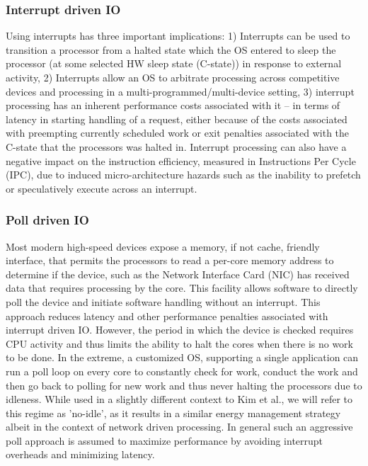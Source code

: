 \subsubsection{Interrupt driven IO}
Using interrupts has three important implications: 1) Interrupts can be used to transition a processor from a halted state which the OS entered to sleep the processor (at some selected HW sleep state (C-state)) in response to external activity, 2)  Interrupts allow an OS to arbitrate processing across competitive devices and processing in a multi-programmed/multi-device setting, 3) interrupt processing has an inherent performance costs associated with it -- in terms of latency in starting handling of a request, either because of the costs associated with preempting currently scheduled work\cite{intelpaper} or exit penalties associated with the C-state that the processors was halted in\cite{}.  Interrupt processing can also have a negative impact on the instruction efficiency, measured in Instructions Per Cycle (IPC), due to induced micro-architecture hazards such as the inability to prefetch or speculatively execute across an interrupt.

\subsubsection{Poll driven IO}

Most modern high-speed devices expose a memory, if not cache, friendly interface, that permits the processors to read a per-core memory address to determine if the device, such as the Network Interface Card (NIC) has received data that requires processing by the core.  This facility allows software to directly poll the device and initiate software handling without an interrupt.  This approach reduces latency and other performance penalties associated with interrupt driven IO.  However, the period in which the device is checked requires CPU activity and thus limits the ability to halt the cores when there is no work to be done.  In the extreme, a customized OS, supporting a single application can run a poll loop on every core to constantly check for work, conduct the work and then go back to polling for new work and thus never halting the processors due to idleness.   While used in a slightly different context to Kim et al.\cite{hank}, we will refer to this regime as 'no-idle', as it results in a similar energy management strategy albeit in the context of network driven processing.  In general such an aggressive poll approach is assumed to maximize performance by avoiding interrupt overheads and minimizing latency. 

